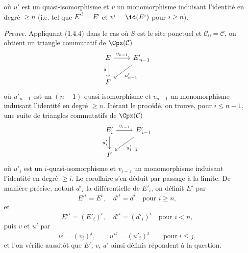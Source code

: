 où \(u'\) est un
quasi-isomorphisme et \(v\) un monomorphisme induisant l'identité en degré \(\geq n\) (i.e. tel que \(E'^i=E^i\) et \(v^i=\id(E^i)\) pour \(i\geq n\)).

\emph{Preuve.} Appliquant (1.4.4) dans le cas où \(S\) est le site ponctuel et \(\mathcal C_0=\mathcal C\), on obtient un triangle commutatif de \(\Cpx(\mathcal C)\)
\[
\begin{tikzcd}
E \arrow[r,"v_{n-1}"] \arrow[d,"u"'] & E'_{\,n-1} \arrow[dl,"u'_{n-1}"]\\
F &
\end{tikzcd}
\]
où \(u'_{n-1}\) est un \((n-1)\)-quasi-isomorphisme et \(v_{n-1}\) un monomorphisme induisant l'identité en degré \(\geq n\). Itérant le procédé, on trouve, pour \(i\leq n-1\), une suite de triangles commutatifs de \(\Cpx(\mathcal C)\)
\[
\begin{tikzcd}
E'_i \arrow[r,"v_{i-1}"] \arrow[d,"u'_i"'] & E'_{\,i-1} \arrow[dl,"u'_{i-1}"]\\
F &
\end{tikzcd}
\]
où \(u'_i\) est un \(i\)-quasi-isomorphisme et \(v_{i-1}\) un monomorphisme induisant l'identité en degré \(\geq i\). Le corollaire s'en déduit par passage à la limite. De manière précise, notant \(d'_i\) la différentielle de \(E'_i\), on définit \(E'\) par
\[
  E'^i=E^i,\quad d'^i=d^i\quad\text{pour }i\geq n,
\]
et
\[
  E'^i=(E'_i)^i,\quad d'^i=(d'_i)^i\quad\text{pour }i<n,
\]
puis \(v\) et \(u'\) par
\[
  v^j=(v_i)^j,\qquad u'^j=(u'_i)^j\qquad\text{pour }i\leq j,
\]
et l'on vérifie aussitôt que \(E'\), \(v\), \(u'\) ainsi définis répondent à la question.

